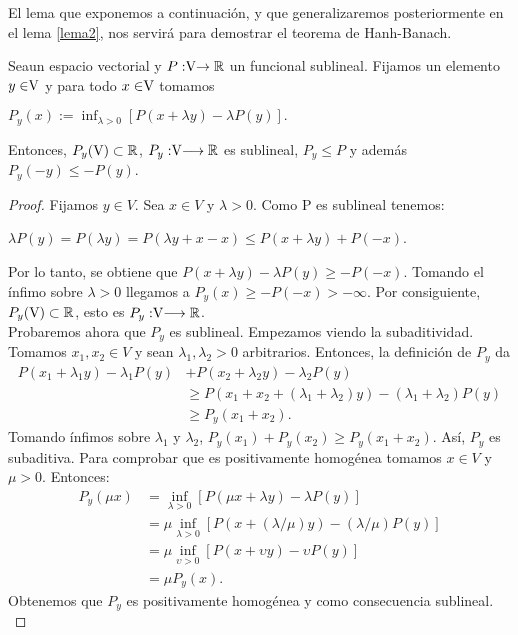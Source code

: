 El lema que exponemos a continuación, y que generalizaremos posteriormente en el lema \ref{lema2}, nos servirá para demostrar el teorema de Hanh-Banach. 
	
\bigskip
	\begin{lemaBox}\label{lema1}
		Sea\vecSpace un espacio vectorial y $P:\vecSpace \rightarrow \RR$ un funcional sublineal. Fijamos un elemento $ y \in \vecSpace $ y para todo $ x \in \vecSpace $ tomamos  
		\begin{center}
			$ P_y(x) := \displaystyle\inf_{\lambda > 0} \left[P(x+\lambda y) - \lambda P(y)\right]. $
		\end{center}
		Entonces, $ P_y(\vecSpace) \subset \RR$, $ P_y:\vecSpace \longrightarrow \RR $ es sublineal, $ P_y \leq P $ y además $ P_y (-y) \leq  -P(y)$.
	\end{lemaBox} 
	\begin{proof}
		Fijamos $ y \in V $. Sea $ x \in V $ y $ \lambda > 0$. Como P es sublineal tenemos: 
		\begin{center}
			$ \lambda P(y) = P(\lambda y) =P(\lambda y +x-x) \leq P(x+\lambda y)+ P(-x)$.
		\end{center}
		Por lo tanto, se obtiene que $ P(x+\lambda y) - \lambda P(y) \geq -P(-x) $.  Tomando el ínfimo sobre $ \lambda >0 $ llegamos a $ P_{y}(x)\geq -P(-x) > -\infty$. Por consiguiente, $ P_y(\vecSpace) \subset \RR$, esto es $ P_y:\vecSpace \longrightarrow \RR $. \\
		
		Probaremos ahora que $ P_y $ es sublineal. Empezamos viendo la subaditividad. Tomamos $ x_1, x_2 \in V $ y sean $ \lambda_1, \lambda_2 > 0$ arbitrarios. Entonces, la definición de $ P_y $ da 
		\begin{equation*}
		\begin{split}
		 P(x_1 + \lambda_1 y) - \lambda_1 P(y)  &+  P(x_2 + \lambda_2 y) - \lambda_2 P(y)  \\
		& \geq  P(x_1 + x_2 + (\lambda_1+\lambda_2)y) - (\lambda_1+\lambda_2) P(y) \\
		&\geq P_y (x_1 + x_2 ).
		\end{split}
		\end{equation*}
		Tomando ínfimos sobre $ \lambda_1 $ y $ \lambda_2 $, $  P_y (x_1)  + P_y (x_2 ) \geq P_y (x_1 + x_2 ) $. Así, $ P_y $ es subaditiva. Para comprobar que es positivamente homogénea tomamos $ x \in V $ y $ \mu > 0 $. Entonces:
		\begin{equation*}
		\begin{split}
		P_y (\mu x) &= \inf_{\lambda > 0} \left[P(\mu x+\lambda y) - \lambda P(y)\right] \\
		&= \mu \inf_{\lambda > 0} \left[P(x+ (\lambda / \mu) y) - (\lambda / \mu) P(y)\right] \\
		&= \mu \inf_{\upsilon > 0} \left[P(x+ \upsilon y) - \upsilon  P(y)\right] \\
		&= \mu P_y (x).
		\end{split}
		\end{equation*}	
		Obtenemos que $ P_y $ es positivamente homogénea y como consecuencia sublineal. \\
		

\end{proof}
